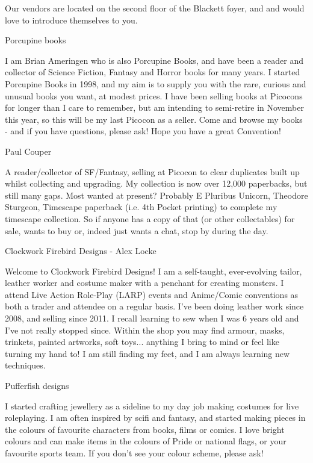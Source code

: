 Our vendors are located on the second floor of the Blackett foyer, and and would love to introduce themselves to you.

{\Large Porcupine books }

I am Brian Ameringen who is also Porcupine Books, and have been a reader and collector of Science Fiction, Fantasy and Horror books for many years. I started Porcupine Books in 1998, and my aim is to supply you with the rare, curious and unusual books you want, at modest prices. I have  been selling books at Picocons for longer than I care to remember, but am intending to semi-retire in November this year, so this will be my last Picocon as a seller. Come and browse my books - and if you have questions, please ask! Hope you have a great Convention!

{\Large Paul Couper }

A reader/collector of SF/Fantasy, selling at Picocon to clear duplicates built up whilst collecting and upgrading.
My collection is now over 12,000 paperbacks, but still many gaps. Most wanted at present? Probably E Pluribus Unicorn, Theodore Sturgeon, Timescape paperback (i.e. 4th Pocket printing) to complete my timescape collection. So if anyone has a copy of that (or other collectables) for sale, wants to buy or, indeed just wants a chat, stop by during the day.

{\Large  Clockwork Firebird Designs - Alex Locke }

Welcome to Clockwork Firebird Designs! I am a self-taught, ever-evolving tailor, leather worker and costume maker with a penchant for creating monsters. I attend Live Action Role-Play (LARP) events and Anime/Comic conventions as both a trader and attendee on a regular basis. I've been doing leather work since 2008, and selling since 2011. I recall learning to sew when I was 6 years old and I've not really stopped since. Within the shop you may find armour, masks, trinkets, painted artworks, soft toys... anything I bring to mind or feel like turning my hand to! I am still finding my feet, and I am always learning new techniques.

{\Large  Pufferfish designs }

I started crafting jewellery as a sideline to my day job making costumes for live roleplaying. I am often inspired by scifi and fantasy, and started making pieces in the colours of favourite characters from books, films or comics. I love bright colours and can make items in the colours of Pride or national flags, or your favourite sports team. If you don't see your colour scheme, please ask!

